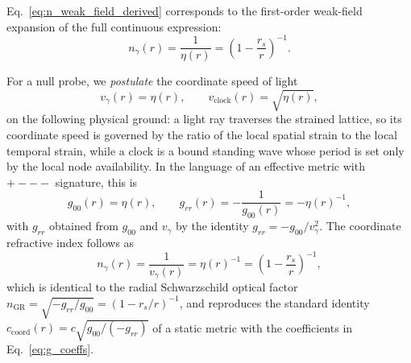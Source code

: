 \documentclass[10pt,a4paper]{article}
\begin{document}
Eq.~\eqref{eq:n_weak_field_derived} corresponds to the first-order weak-field expansion of the full continuous expression:
\begin{equation}
	n_\gamma(r) = \frac{1}{\eta(r)} = \left(1 - \frac{r_s}{r}\right)^{-1}.
	\label{eq:n_full}
\end{equation}

For a null probe, we \emph{postulate} the coordinate speed of light
\begin{equation}
	v_\gamma(r) = \eta(r),
	\qquad
	v_\text{clock}(r) = \sqrt{\eta(r)},
	\label{eq:v_null_v_clock}
\end{equation}
on the following physical ground: a light ray traverses the strained
lattice, so its coordinate speed is governed by the ratio of the local
spatial strain to the local temporal strain, while a clock is a bound
standing wave whose period is set only by the local node availability.
In the language of an effective metric with $+---$ signature, this is
\begin{equation}
	g_{00}(r) = \eta(r),
	\qquad
	g_{rr}(r) = -\frac{1}{g_{00}(r)} = -\eta(r)^{-1},
	\label{eq:g_coeffs}
\end{equation}
with $g_{rr}$ obtained from $g_{00}$ and $v_\gamma$ by the identity
$g_{rr} = -g_{00}/v_\gamma^2$. The coordinate refractive index follows
as
\begin{equation}
	n_\gamma(r) = \frac{1}{v_\gamma(r)} = \eta(r)^{-1}
	= \left(1 - \frac{r_s}{r}\right)^{-1},
	\label{eq:n_gamma_from_postulate}
\end{equation}
which is identical to the radial Schwarzschild optical factor
$n_\text{GR} = \sqrt{-g_{rr}/g_{00}} = (1-r_s/r)^{-1}$, and reproduces
the standard identity $c_\text{coord}(r) = c\sqrt{g_{00}/(-g_{rr})}$
of a static metric with the coefficients in
Eq.~\eqref{eq:g_coeffs}.
%
%
\end{document}
